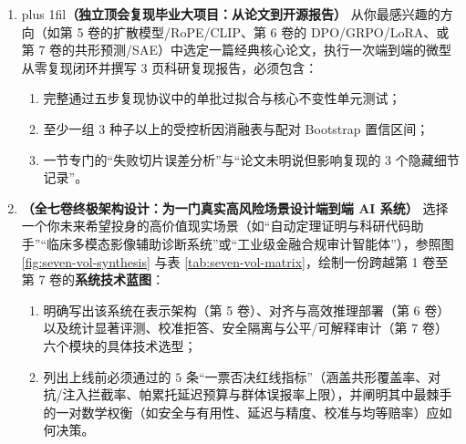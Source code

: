 \begin{enumerate}[label=\textbf{7.6.\arabic*}, start=7]
  \item {\rightskip=0pt plus 1fil\relax \textbf{（独立顶会复现毕业大项目：从论文到开源报告）} 从你最感兴趣的方向（如第 5 卷的扩散模型/RoPE/CLIP、第 6 卷的 DPO/GRPO/LoRA、或第 7 卷的共形预测/SAE）中选定一篇经典核心论文，执行一次端到端的微型从零复现闭环并撰写 $3$ 页科研复现报告，必须包含：\par}
  \begin{enumerate}
    \item 完整通过五步复现协议中的单批过拟合与核心不变性单元测试；
    \item 至少一组 $3$ 种子以上的受控析因消融表与配对 Bootstrap 置信区间；
    \item 一节专门的“失败切片误差分析”与“论文未明说但影响复现的 3 个隐藏细节记录”。
  \end{enumerate}

  \item \textbf{（全七卷终极架构设计：为一门真实高风险场景设计端到端 AI 系统）} 选择一个你未来希望投身的高价值现实场景（如“自动定理证明与科研代码助手”“临床多模态影像辅助诊断系统”或“工业级金融合规审计智能体”），参照图 \ref{fig:seven-vol-synthesis} 与表 \ref{tab:seven-vol-matrix}，绘制一份跨越第 1 卷至第 7 卷的\textbf{系统技术蓝图}：
  \begin{enumerate}
    \item 明确写出该系统在表示架构（第 5 卷）、对齐与高效推理部署（第 6 卷）以及统计显著评测、校准拒答、安全隔离与公平/可解释审计（第 7 卷）六个模块的具体技术选型；
    \item 列出上线前必须通过的 $5$ 条“一票否决红线指标”（涵盖共形覆盖率、对抗/注入拦截率、帕累托延迟预算与群体误报率上限），并阐明其中最棘手的一对数学权衡（如安全与有用性、延迟与精度、校准与均等赔率）应如何决策。
  \end{enumerate}
\end{enumerate}

